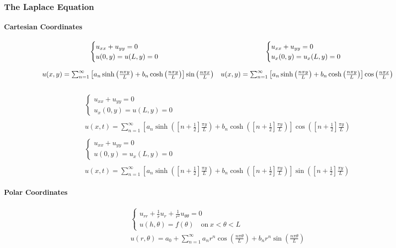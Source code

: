 \documentclass{article}
\begin{document}
\subsubsection{The Laplace Equation}
\paragraph{Cartesian Coordinates}
\[
\begin{array}{c c}
\begin{cases}
u_{xx} + u_{yy} = 0\\
u(0,y) = u(L,y) = 0
\end{cases}
&
\begin{cases}
u_{xx} + u_{yy} = 0\\
u_{x}(0,y) = u_{x}(L,y) = 0
\end{cases}\\
&\\
u(x,y) = \sum_{n=1}^{\infty}\left[a_{n}\sinh{\left(\frac{n \pi y}{L}\right)} + b_{n}\cosh{\left(\frac{n\pi y}{L}\right)}\right]\sin{\left(\frac{n\pi x}{L}\right)}
& u(x,y) = \sum_{n=1}^{\infty}\left[a_{n}\sinh{\left(\frac{n \pi y}{L}\right)} + b_{n}\cosh{\left(\frac{n\pi y}{L}\right)}\right]\cos{\left(\frac{n\pi x}{L}\right)}
\end{array}
\]
\\
\[
\begin{array}{c}
\begin{cases}
u_{xx} + u_{yy} = 0\\
u_{x}(0,y) = u(L,y) = 0
\end{cases}\\
\\
u(x,t) = \sum_{n=1}^{\infty}\left[a_{n}\sinh{\left(\left[n + \frac{1}{2}\right]\frac{\pi y}{L}\right)} + b_{n}\cosh{\left(\left[n + \frac{1}{2}\right]\frac{\pi y}{L}\right)}\right]\cos{\left(\left[n + \frac{1}{2}\right]\frac{\pi y}{L}\right)}\\
\\
\begin{cases}
u_{xx} + u_{yy} = 0\\
u(0,y) = u_{x}(L,y) = 0
\end{cases}\\
\\
u(x,t) = \sum_{n=1}^{\infty}\left[a_{n}\sinh{\left(\left[n + \frac{1}{2}\right]\frac{\pi y}{L}\right)} + b_{n}\cosh{\left(\left[n + \frac{1}{2}\right]\frac{\pi y}{L}\right)}\right]\sin{\left(\left[n + \frac{1}{2}\right]\frac{\pi y}{L}\right)}
\end{array}
\]
\paragraph{Polar Coordinates}
\begin{gather*}
\begin{cases}
u_{rr} + \frac{1}{r}u_{r} + \frac{1}{r^{2}}u_{\theta\theta} = 0\\
u(h,\theta) = f(\theta)\quad \text{on}\ x < \theta < L
\end{cases}\\
u(r,\theta) = a_{0} + \sum_{n=1}^{\infty}a_{n}r^{n}\cos{\left(\frac{n \pi \theta}{L}\right)} + b_{n}r^{n}\sin{\left(\frac{n \pi \theta}{L}\right)}
\end{gather*}
\end{document}
